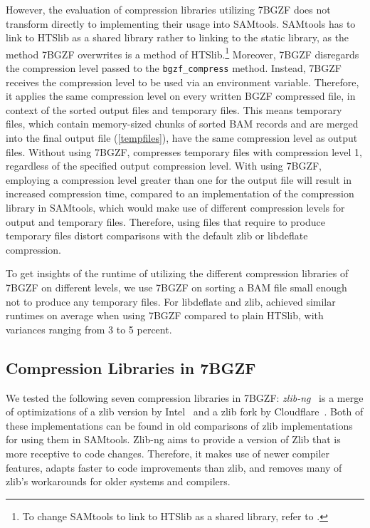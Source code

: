 However, the evaluation of compression libraries utilizing 7BGZF does not transform directly to implementing their usage into SAMtools. SAMtools has to link to HTSlib as a shared library rather to linking to the static library, as the method 7BGZF overwrites is a method of HTSlib.\footnote{To change SAMtools to link to HTSlib as a shared library, refer to .}
Moreover, 7BGZF disregards the compression level passed to the \texttt{bgzf\_compress} method. Instead, 7BGZF receives the compression level to be used via an environment variable. Therefore, it applies the same compression level on every written BGZF compressed file, in context of \sort the sorted output files and temporary files. 
This means temporary files, which contain memory-sized chunks of sorted BAM records and are merged into the final output file (\ref{tempfiles}), have the same compression level as output files. Without using 7BGZF, \sort compresses temporary files with compression level 1, regardless of the specified output compression level. With using 7BGZF, employing a compression level greater than one for the output file will result in increased compression time, compared to an implementation of the compression library in SAMtools, which would make use of different compression levels for output and temporary files. Therefore, using files that require \sort to produce temporary files distort comparisons with the default zlib or libdeflate compression.

To get insights of the runtime of \sort utilizing the different compression libraries of 7BGZF on different levels, we use 7BGZF on sorting a BAM file small enough not to produce any temporary files. For libdeflate and zlib, \sort achieved similar runtimes on average when using 7BGZF compared to plain HTSlib, with variances ranging from 3 to 5 percent. 

\subsection{Compression Libraries in 7BGZF}

We tested the following seven compression libraries in 7BGZF:
\textit{zlib-ng}~\cite{noauthor_zlib-ngzlib-ng_2024} is a merge of optimizations of a zlib version by Intel~\cite{noauthor_intelzlib_2024} and a zlib fork by Cloudflare~\cite{noauthor_cloudflarezlib_2024}. Both of these implementations can be found in old comparisons of zlib implementations for using them in SAMtools. Zlib-ng aims to provide a version of Zlib that is more receptive to code changes. Therefore, it makes use of newer compiler features, adapts faster to code improvements than zlib, and removes many of zlib's workarounds for older systems and compilers. 

